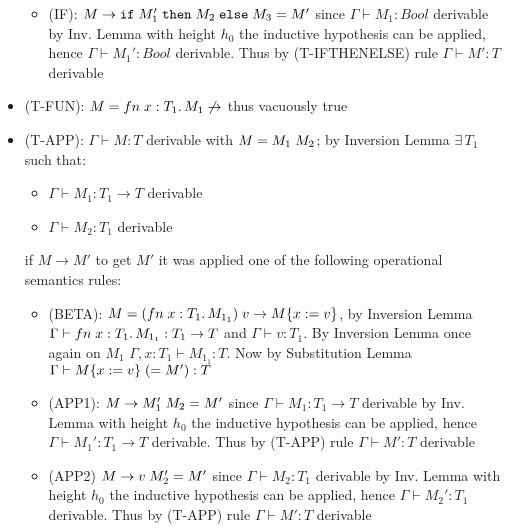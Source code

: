 \begin{itemize}
\begin{itemize}
		      \item (IF): $M \to \texttt{if}\;M_1'\;\texttt{then}\;M_2\;\texttt{else}\;M_3 = M'$ since $\Gamma \vdash M_1: Bool$ derivable
		            by Inv. Lemma with height $h_0$ the inductive hypothesis can be applied, hence
		            $\Gamma \vdash M_1': Bool$ derivable. Thus by (T-IFTHENELSE) rule
		            $\Gamma \vdash M': T$ derivable
	      \end{itemize}
	\item (T-FUN): $M = fn\;x: T_1.\,M_1 \not\to$ thus vacuously true
	\item (T-APP): $\Gamma \vdash M: T$ derivable with $M = M_1\;M_2$;
	      by Inversion Lemma $\exists\,T_1$ such that:
	      \begin{itemize}
		      \item $\Gamma \vdash M_1: T_1 \to T$ derivable
		      \item $\Gamma \vdash M_2: T_1$ derivable
	      \end{itemize}
	      if $M \to M'$ to get $M'$ it was applied one of the following operational semantics rules:
	      \begin{itemize}
		      \item (BETA): $M = (fn\;x: T_1.\,M_{1_1})\;v \to M\{x:=v\}$, by Inversion
		            Lemma\\
		            $\Gamma \vdash fn\;x:T_1.\,M_{1_1}: T_1 \to T$ and $\Gamma \vdash v: T_1$.
		            By Inversion Lemma once again on $M_1$ $\Gamma, x: T_1 \vdash M_{1_1}: T$.
		            Now by Substitution Lemma $\Gamma \vdash M\{x:=v\}\;(= M'): T$
		      \item (APP1): $M \to M_1'\;M_2 = M'$ since $\Gamma \vdash M_1: T_1 \to T$
		            derivable by Inv. Lemma with height $h_0$ the inductive hypothesis can be applied,
		            hence $\Gamma \vdash M_1': T_1 \to T$ derivable. Thus by (T-APP) rule
		            $\Gamma \vdash M': T$ derivable
		      \item (APP2) $M \to v\;M_2' = M'$ since $\Gamma \vdash M_2: T_1$ derivable by
		            Inv. Lemma with height $h_0$ the inductive hypothesis can be applied,
		            hence $\Gamma \vdash M_2': T_1$ derivable. Thus by (T-APP) rule
		            $\Gamma \vdash M': T$ derivable
	      \end{itemize}
\end{itemize}
